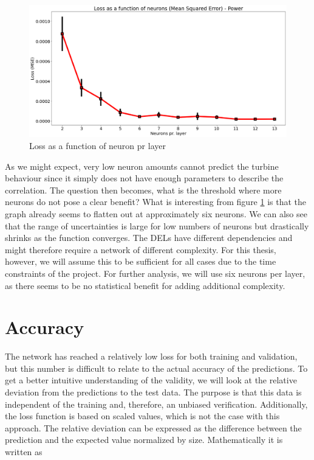 \begin{figure}[H]
    \centering
    \includegraphics[scale=0.28]{Illustrations/neuron_loss.png}
    \caption{Loss as a function of neuron pr layer}
    \label{fig:neuronloss}
\end{figure}

As we might expect, very low neuron amounts cannot predict the turbine behaviour since it simply does not have enough parameters to describe the correlation. The question then becomes, what is the threshold where more neurons do not pose a clear benefit? What is interesting from figure \ref{fig:neuronloss} is that the graph already seems to flatten out at approximately six neurons. We can also see that the range of uncertainties is large for low numbers of neurons but drastically shrinks as the function converges. The DELs have different dependencies and might therefore require a network of different complexity. For this thesis, however, we will assume this to be sufficient for all cases due to the time constraints of the project. For further analysis, we will use six neurons per layer, as there seems to be no statistical benefit for adding additional complexity. 


\section{Accuracy}

The network has reached a relatively low loss for both training and validation, but this number is difficult to relate to the actual accuracy of the predictions. To get a better intuitive understanding of the validity, we will look at the relative deviation from the predictions to the test data. The purpose is that this data is independent of the training and, therefore, an unbiased verification. Additionally, the loss function is based on scaled values, which is not the case with this approach. The relative deviation can be expressed as the difference between the prediction and the expected value normalized by size. Mathematically it is written as

